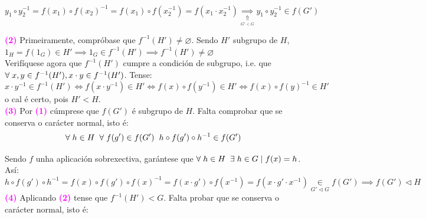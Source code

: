 \documentclass[twoside]{report}
\newcommand{\magbf}[1]{\textcolor{magenta}{\textbf{#1}}} %
\theoremstyle{mystyle}
\begin{document}
$$y_{1} \circ y_{2}^{-1} = f(x_{1}) \circ f(x_{2})^{-1} = f(x_{1}) \circ f(x_{2}^{-1}) = f(x_{1} \cdot x_{2}^{-1}) \underset{\underset{G' < G}{\Uparrow}}{\implies} y_{1} \circ y_{2}^{-1} \in f(G')$$

\noindent \textcolor{magenta}{\textbf{(2)}} Primeiramente, compróbase que $f^{-1}(H') \neq \varnothing$. Sendo $H'$ subgrupo de $H$, $1_{H} = f(1_{G}) \in H'\implies 1_{G} \in f^{-1}(H') \implies f^{-1}(H') \neq \varnothing$\\

\noindent Verifíquese agora que $f^{-1}(H')$ cumpre a condición de subgrupo, i.e. que $\forall \hspace{1mm} x,y \in f^{-1}(H'), x \cdot y \in f^{-1}(H')$. Tense:\\

 $x \cdot y^{-1} \in f^{-1}(H') \Longleftrightarrow f(x \cdot y^{-1}) \in H' \Longleftrightarrow f(x) \circ f(y^{-1}) \in H' \Longleftrightarrow f(x) \circ f(y)^{-1} \in H'$\\
 
\noindent o cal é certo, pois $H' < H$. \\

\noindent \textcolor{magenta}{\textbf{(3)}} Por \magbf{(1)} cúmprese que $f(G')$ é subgrupo de $H$. Falta comprobar que se conserva o carácter normal, isto é: 
$$\forall \hspace{1mm} h \in H \hspace{2MM} \forall \hspace{1mm} f(g') \in f(G') \hspace{2mm} h \circ f(g') \circ h^{-1} \in f(G')$$

\noindent Sendo $f$ unha aplicación sobrexectiva, garántese que $\forall \hspace{1mm} h \in H \hspace{2mm} \exists \hspace{1mm} h \in G \hspace{1mm} | \hspace{1mm} f(x) = h$. Así:\\

$h \circ f(g') \circ h^{-1} = f(x) \circ f(g') \circ f(x)^{-1} = f(x \cdot g') \circ f(x^{-1}) = f(x \cdot g' \cdot x^{-1}) \underset{G' \triangleleft G}{\in} f(G') \implies f(G') \triangleleft H $ \\

\noindent \textcolor{magenta}{\textbf{(4)}} Aplicando \magbf{(2)} tense que $f^{-1}(H') < G$. Falta probar que se conserva o carácter normal, isto é:
\end{document}
